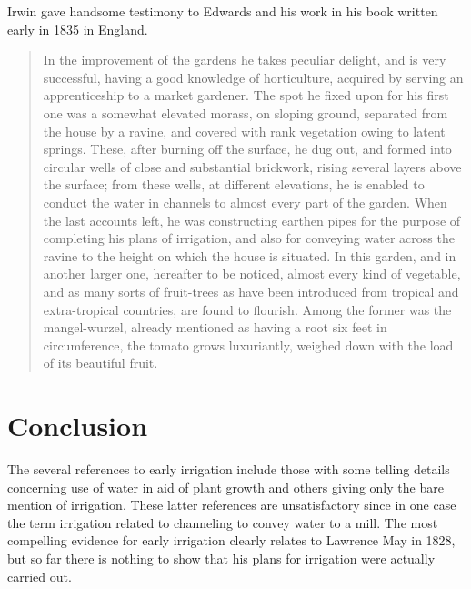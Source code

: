 Irwin gave handsome testimony to Edwards and his work in his book
written early in 1835 in England.
\begin{quote}
	In the improvement of the gardens he takes peculiar delight,
	and is very successful, having a good knowledge of
	horticulture, acquired by serving an apprenticeship to a
	market gardener.  The spot he fixed upon for his first one was
	a somewhat elevated morass, on sloping ground, separated from
	the house by a ravine, and covered with rank vegetation owing
	to latent springs.  These, after burning off the surface, he
	dug out, and formed into circular wells of close and
	substantial brickwork, rising several layers above the
	surface; from these wells, at different elevations, he is
	enabled to conduct the water in channels to almost every part
	of the garden.  When the last accounts left, he was
	constructing earthen pipes for the purpose of completing his
	plans of irrigation, and also for conveying water across the
	ravine to the height on which the house is situated.  In this
	garden, and in another larger one, hereafter to be noticed,
	almost every kind of vegetable, and as many sorts of
	fruit-trees as have been introduced from tropical and
	extra-tropical countries, are found to flourish.  Among the
	former was the mangel-wurzel, already mentioned as having a
	root six feet in circumference, the tomato grows luxuriantly,
	weighed down with the load of its beautiful
	fruit.
\end{quote}

\section*{Conclusion}
\label{sec:conc}

The several references to early irrigation include those with some
telling details concerning use of water in aid of plant growth and
others giving only the bare mention of irrigation. These latter
references are unsatisfactory since in one case the term irrigation
related to channeling to convey water to a mill.  The most compelling
evidence for early irrigation clearly relates to Lawrence May in 1828,
but so far there is nothing to show that his plans for irrigation were
actually carried out.

